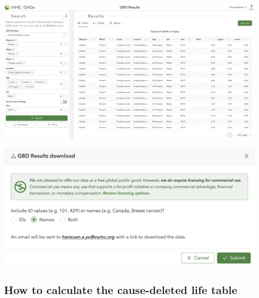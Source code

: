 \documentclass[
  letterpaper,
  DIV=11,
  numbers=noendperiod]{scrartcl}
\begin{document}
\includegraphics{exercise/prostate-cancer-cause-death.png}

\includegraphics{exercise/GBD-download-request.png}

\hypertarget{how-to-calculate-the-cause-deleted-life-table}{%
\subsection{How to calculate the cause-deleted life
table}\label{how-to-calculate-the-cause-deleted-life-table}}
\end{document}
